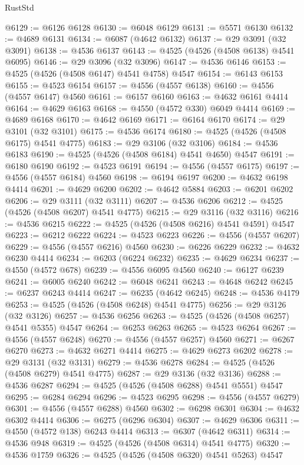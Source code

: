 \begin{lexlean}{RustStd}
\begin{coremodule}
@6129 := @6126 @6128
@6130 := @6048 @6129
@6131 := @5571 @6130
@6132 := @4689 @6131
@6134 := @6087 (@4642 @6132)
@6137 := @29 @3091 (@32 @3091)
@6138 := @4536 @6137
@6143 := @4525 (@4526 (@4508 @6138) @4541 @6095)
@6146 := @29 @3096 (@32 @3096)
@6147 := @4536 @6146
@6153 := @4525 (@4526 (@4508 @6147) @4541 @4758) @4547
@6154 := @6143 @6153
@6155 := @4523 @6154
@6157 := @4556 (@4557 @6138)
@6160 := @4556 (@4557 @6147) @4560
@6161 := @6157 @6160
@6163 := @4632 @6161 @4414
@6164 := @4629 @6163
@6168 := @4550 (@4572 @330) @6049 @4414
@6169 := @4689 @6168
@6170 := @4642 @6169
@6171 := @6164 @6170
@6174 := @29 @3101 (@32 @3101)
@6175 := @4536 @6174
@6180 := @4525 (@4526 (@4508 @6175) @4541 @4775)
@6183 := @29 @3106 (@32 @3106)
@6184 := @4536 @6183
@6190 := @4525 (@4526 (@4508 @6184) @4541 @4650) @4547
@6191 := @6180 @6190
@6192 := @4523 @6191
@6194 := @4556 (@4557 @6175)
@6197 := @4556 (@4557 @6184) @4560
@6198 := @6194 @6197
@6200 := @4632 @6198 @4414
@6201 := @4629 @6200
@6202 := @4642 @5884
@6203 := @6201 @6202
@6206 := @29 @3111 (@32 @3111)
@6207 := @4536 @6206
@6212 := @4525 (@4526 (@4508 @6207) @4541 @4775)
@6215 := @29 @3116 (@32 @3116)
@6216 := @4536 @6215
@6222 := @4525 (@4526 (@4508 @6216) @4541 @4591) @4547
@6223 := @6212 @6222
@6224 := @4523 @6223
@6226 := @4556 (@4557 @6207)
@6229 := @4556 (@4557 @6216) @4560
@6230 := @6226 @6229
@6232 := @4632 @6230 @4414
@6234 := @6203 (@6224 @6232)
@6235 := @4629 @6234
@6237 := @4550 (@4572 @678)
@6239 := @4556 @6095 @4560
@6240 := @6127 @6239
@6241 := @6005 @6240
@6242 := @6048 @6241
@6243 := @4648 @6242
@6245 := @6237 @6243 @4414
@6247 := @6235 (@4642 @6245)
@6248 := @4536 @4179
@6253 := @4525 (@4526 (@4508 @6248) @4541 @4775)
@6256 := @29 @3126 (@32 @3126)
@6257 := @4536 @6256
@6263 := @4525 (@4526 (@4508 @6257) @4541 @5355) @4547
@6264 := @6253 @6263
@6265 := @4523 @6264
@6267 := @4556 (@4557 @6248)
@6270 := @4556 (@4557 @6257) @4560
@6271 := @6267 @6270
@6273 := @4632 @6271 @4414
@6275 := @4629 @6273 @6202
@6278 := @29 @3131 (@32 @3131)
@6279 := @4536 @6278
@6284 := @4525 (@4526 (@4508 @6279) @4541 @4775)
@6287 := @29 @3136 (@32 @3136)
@6288 := @4536 @6287
@6294 := @4525 (@4526 (@4508 @6288) @4541 @5551) @4547
@6295 := @6284 @6294
@6296 := @4523 @6295
@6298 := @4556 (@4557 @6279)
@6301 := @4556 (@4557 @6288) @4560
@6302 := @6298 @6301
@6304 := @4632 @6302 @4414
@6306 := @6275 (@6296 @6304)
@6307 := @4629 @6306
@6311 := @4550 (@4572 @138) @6243 @4414
@6313 := @6307 (@4642 @6311)
@6314 := @4536 @948
@6319 := @4525 (@4526 (@4508 @6314) @4541 @4775)
@6320 := @4536 @1759
@6326 := @4525 (@4526 (@4508 @6320) @4541 @5263) @4547

\end{coremodule}
\end{lexlean}
